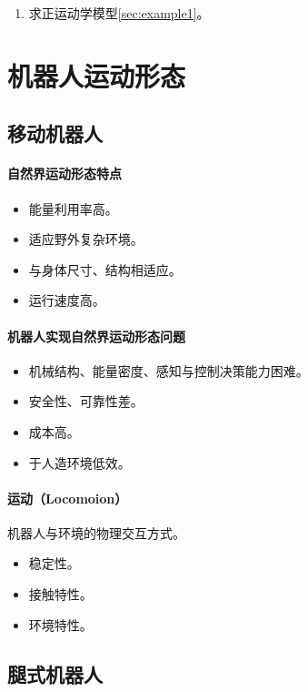 \documentclass[
12pt, %
a4paper, 
oneside, %
headinclude,footinclude, %
]{scrartcl}
\begin{document}
\begin{enumerate}
\item 求正运动学模型\ref{sec:example1}。
\end{enumerate}
\section{机器人运动形态}
\subsection{移动机器人}
\paragraph{自然界运动形态特点}
\begin{itemize}
\item 能量利用率高。
\item 适应野外复杂环境。
\item 与身体尺寸、结构相适应。
\item 运行速度高。
\end{itemize}
\paragraph{机器人实现自然界运动形态问题}
\begin{itemize}
\item 机械结构、能量密度、感知与控制决策能力困难。
\item 安全性、可靠性差。
\item 成本高。
\item 于人造环境低效。
\end{itemize}
\paragraph{运动（Locomoion）}
机器人与环境的物理交互方式。
\begin{itemize}
\item 稳定性。
\item 接触特性。
\item 环境特性。
\end{itemize}
\subsection{腿式机器人}
\end{document}

